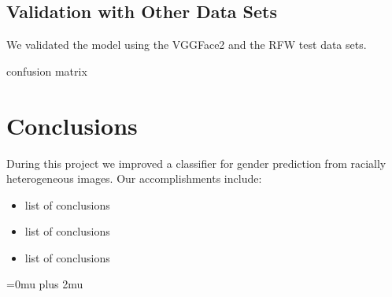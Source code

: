 \documentclass[obeyspaces, spaces, fleqn,10pt]{SelfArx} %
\begin{document}
\subsection{Validation with Other Data Sets}
We validated the model using the VGGFace2 and the RFW test data sets. 
\lipsum[11] %

confusion matrix

\section{Conclusions}
During this project we improved a classifier for gender prediction from racially heterogeneous images. Our accomplishments include:


\begin{itemize}
\item list of conclusions
\item list of conclusions
\item list of conclusions
\end{itemize}

\Urlmuskip=0mu plus 2mu\relax



\end{document}
